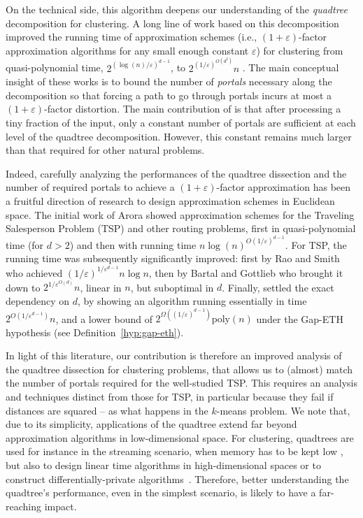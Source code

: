\documentclass[11pt]{article}
\newcommand{\eps}{\varepsilon}
\newcommand{\poly}{\mathrm{ poly}}
\newcommand{\lpar}{\left(}
\newcommand{\rpar}{\right)}
\begin{document}
On the technical side, this algorithm deepens our understanding of the \emph{quadtree} decomposition for clustering.
A long line of work based on this decomposition \cite{AroraRR98, KolliopoulosR07, FriggstadRS19, Cohen-AddadKM19, Cohen-Addad18, jacm} improved the running time of approximation schemes (i.e., $(1+\eps)$-factor approximation
algorithms for any small enough constant $\eps$) for clustering from quasi-polynomial time, $2^{(\log(n)/\eps)^{d-1}}$, to  $2^{(1/\eps)^{O(d^2)}} n$ \cite{jacm}. 
The main conceptual insight of these works is to bound the number of \emph{portals} necessary along the decomposition so that forcing a path to go through portals incurs at most a $(1+\eps)$-factor distortion.
The main contribution of \cite{jacm} is that after processing a tiny fraction of the input, only a constant number of portals are sufficient at each level of the quadtree decomposition.
However, this constant remains much larger than that required for other natural problems.

Indeed, carefully analyzing the performances of the quadtree dissection and the number of required portals to achieve a $(1+\eps)$-factor approximation has been a fruitful direction of research to design approximation schemes in Euclidean space.
The initial work of Arora \cite{Arora96, Arora98} showed approximation schemes for the Traveling Salesperson Problem (TSP) and other routing problems, first in quasi-polynomial time (for $d > 2$) and then with running time $n \log(n)^{O(1/\eps)^{d-1}}$. 
For TSP, the running time was subsequently significantly improved: first by Rao and Smith~\cite{rao1998approximating} who achieved $(1/\eps)^{1/\eps^{d-1}} n \log n$, then by Bartal and Gottlieb \cite{BartalG13} who brought it down to $2^{1/\eps^{O(d)}} n$, linear in $n$, but suboptimal in $d$. 
Finally, \cite{Kisfaludi-BakNW21} settled the exact dependency on $d$, by showing an algorithm running essentially in time $2^{O\lpar 1/\eps^{d-1}\rpar} n$, and a lower bound of $2^{\Omega\lpar (1/\eps)^{d-1}\rpar} \poly(n)$ under the Gap-ETH hypothesis \cite{D16,MR16} (see Definition~\ref{hyp:gap-eth}).

In light of this literature, our contribution is therefore an improved analysis of the quadtree dissection for clustering problems, that allows us to (almost) match the number of portals required for the well-studied TSP. This requires an analysis and techniques distinct from those for TSP, in particular because they fail if distances are squared -- as what happens in the $k$-means problem.
We note that, due to its simplicity, applications of the quadtree extend far beyond approximation algorithms in low-dimensional space. 
For clustering, quadtrees are used for instance in the streaming scenario, when memory has to be kept low \cite{BravermanFLSY17}, but also to design linear time algorithms in high-dimensional spaces \cite{rejectionSampling} or to construct differentially-private algorithms~\cite{kdd}. 
Therefore, better understanding the quadtree's performance, even in the simplest scenario, is likely to have a far-reaching impact.
\end{document}
